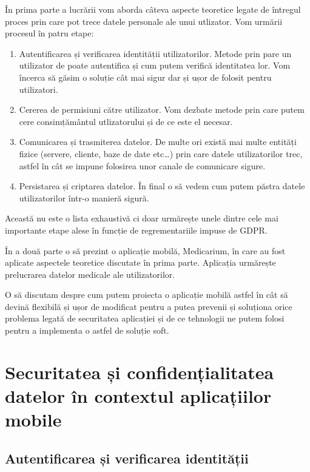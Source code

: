 \documentclass[12pt]{article}
\begin{document}
În prima parte a lucrării vom aborda câteva aspecte teoretice legate de întregul proces
prin care pot trece datele personale ale unui utlizator.
Vom urmării procesul în patru etape:

\begin{enumerate}
    \item Autentificarea și verificarea identității utilizatorilor. Metode prin pare un utilizator 
    de poate autentifica și cum putem verifică
    identitatea lor. Vom încerca să găsim o soluție cât mai sigur dar și ușor de
    folosit pentru utilizatori.
    \item Cererea de permisiuni către utilizator. Vom dezbate metode prin
    care putem cere consimțământul utlizatorului și de ce este el necesar.
    \item Comunicarea și trasmiterea datelor. De multe ori există mai multe entități fizice 
    (servere, cliente, baze de date etc\dots) prin care datele utilizatorilor trec, 
    astfel în cât se impune folosirea unor canale de comunicare sigure.
    \item Persistarea și criptarea datelor. În final o să vedem cum putem păstra
    datele utilizatorilor într-o manieră sigură.  
\end{enumerate}

Această nu este o lista exhaustivă ci doar urmărește unele dintre cele mai importante 
etape alese în funcție de regrementariile impuse de GDPR. 

\bigskip

În a două parte o să prezint o aplicație mobilă, Medicarium, în care au fost aplicate
aspectele teoretice discutate în prima parte. Aplicația urmărește prelucrarea datelor
medicale ale utilizatorilor. 

O să discutam despre cum putem proiecta o aplicație mobilă astfel în cât
să devină flexibilă și ușor de modificat pentru a putea prevenii și soluționa orice
problema legată de securitatea aplicației și de ce tehnologii ne putem 
folosi pentru a implementa o astfel de soluție soft.


\newpage
\section{Securitatea și confidențialitatea datelor în contextul aplicațiilor mobile}
\subsection{Autentificarea și verificarea identității}
\end{document}
